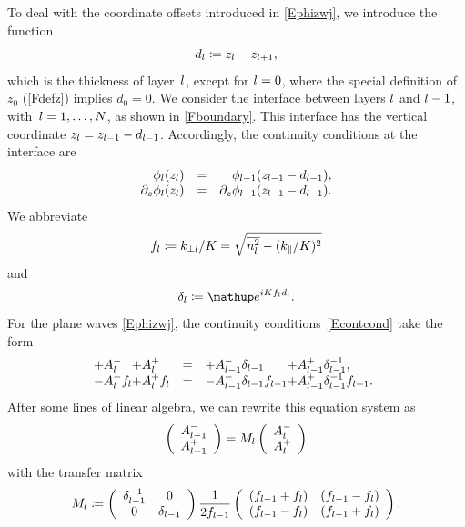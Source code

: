 To deal with the coordinate offsets introduced in \cref{Ephizwj},
we introduce the function%
\begin{equation}
  d_l\coloneqq z_{l}-z_{l+1},
\end{equation}
which is the thickness of layer~$l$,
except for $l=0$,
where the special definition of $z_0$ (\cref{Fdefz}) implies $d_0=0$.
We consider the interface between layers $l$ and $l-1$,
with~$l=1,\ldots,N$, as shown in \cref{Fboundary}.
This interface has the vertical coordinate $z_{l}=z_{l-1}-d_{l-1}$.
Accordingly, the continuity conditions at the interface are
\begin{equation}\label{Econtcond}
  \begin{array}{lcl}
 \hphantom{\partial_z}\phi_{l}(z_{l}) &=& \hphantom{\partial_z}\phi_{l-1}(z_{l-1}-d_{l-1}),\\
           \partial_z \phi_{l}(z_{l}) &=&           \partial_z \phi_{l-1}(z_{l-1}-d_{l-1}).
  \end{array}
\end{equation}
We abbreviate
\begin{equation}
  f_l \coloneqq  k_{\perp l}/K = \sqrt{\overline{n_l^2}-(k_\parallel/K)^2}
\end{equation}
and
\begin{equation}
   \delta_\il \coloneqq  \e^{iKf_\il d_\il}.
\end{equation}
For the plane waves \cref{Ephizwj},
the continuity conditions~\cref{Econtcond} take the form
\begin{equation}\label{Econt2}
  \begin{array}{@{}l@{}lcl@{}l}
  +A^-_{\il} &+A^+_{\il}
  &=&
  +A^-_{\il-1}\delta_{\il-1} &+A^+_{\il-1}\delta_{\il-1}^{-1},
  \\
  -A^-_{\il} f_{\il}  &+A^+_{\il} f_{\il}
  &=&
  -A^-_{\il-1}\delta_{\il-1} f_{\il-1} &+A^+_{\il-1}\delta_{\il-1}^{-1} f_{\il-1}.
  \end{array}
\end{equation}
After some lines of linear algebra,
we can rewrite this equation system as
\begin{equation}\label{EcMc}
  \left( \begin{array}{c}A^-_{l-1}\\ A^+_{l-1}\end{array} \right)
  = M_{l} \left( \begin{array}{c}A^-_{l}\\A^+_{l}\end{array} \right)
\end{equation}
with the transfer matrix
\begin{equation}\label{EMil}
  M_l
   \coloneqq
   \left(\begin{array}{cc}
     \delta_{l-1}^{-1}&0\\
       0 & \delta_{l-1}
   \end{array}\right)
   \frac{1}{2f_{l-1}}
   \left(\begin{array}{cc}
       (f_{l-1}+f_{l})&(f_{l-1}-f_{l})\\
       (f_{l-1}-f_{l})&(f_{l-1}+f_{l})
   \end{array}\right).
\end{equation}

